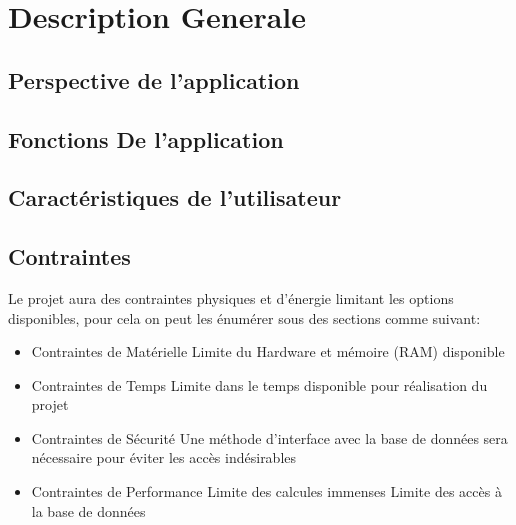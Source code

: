 \section{Description Generale}

\subsection{Perspective de l'application}

\subsection{Fonctions De l'application}

\subsection{Caractéristiques de l'utilisateur}

\subsection{Contraintes}
Le projet aura des contraintes physiques et d'énergie limitant les options disponibles, pour cela on peut les énumérer sous des sections comme suivant:
\begin{itemize}
    \item Contraintes de Matérielle
        \subitem Limite du Hardware et mémoire (RAM) disponible
    \item Contraintes de Temps
        \subitem Limite dans le temps disponible pour réalisation du projet
    \item Contraintes de Sécurité
        \subitem Une méthode d'interface avec la base de données sera nécessaire pour éviter les accès indésirables
    \item Contraintes de Performance
        \subitem Limite des calcules immenses
        \subitem Limite des accès à la base de données
\end{itemize}
